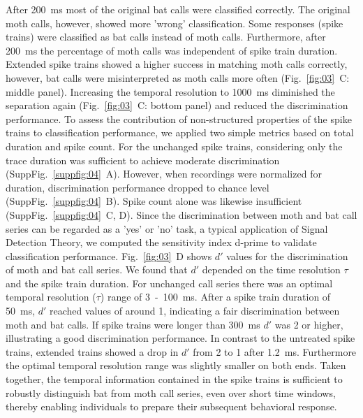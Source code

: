 \documentclass[12pt,a4paper]{article}
\newcommand{\fig}[2]{(Fig.~#1~#2)}
\newcommand{\suppfig}[2]{(SuppFig.~#1~#2)}
\begin{document}
After 200~ms most of the original bat calls were classified correctly. The original moth calls, however, showed more 'wrong' classification. Some responses (spike trains) were classified as bat calls instead of moth calls. Furthermore, after 200~ms the percentage of moth calls was independent of spike train duration. Extended spike trains showed a higher success in matching moth calls correctly, however, bat calls were misinterpreted as moth calls more often \fig{\ref{fig:03}}{C: middle panel}. Increasing the temporal resolution to 1000~ms diminished the separation again \fig{\ref{fig:03}}{C: bottom panel} and reduced the discrimination performance. To assess the contribution of non-structured properties of the spike trains to classification performance, we applied two simple metrics based on total duration and spike count. For the unchanged spike trains, considering only the trace duration was sufficient to achieve moderate discrimination \suppfig{\ref{suppfig:04}}{A}. However, when recordings were normalized for duration, discrimination performance dropped to chance level \suppfig{\ref{suppfig:04}}{B}. Spike count alone was likewise insufficient \suppfig{\ref{suppfig:04}}{C, D}. Since the discrimination between moth and bat call series can be regarded as a 'yes' or 'no' task, a typical application of Signal Detection Theory, we computed the sensitivity index d-prime to validate classification performance. Fig.~\ref{fig:03}~D shows $d'$ values for the discrimination of moth and bat call series. We found that $d'$ depended on the time resolution $\tau$ and the spike train duration. For unchanged call series there was an optimal temporal resolution ($ \tau $) range of 3~-~100~ms. After a spike train duration of 50~ms, $d'$ reached values of around 1, indicating a fair discrimination between moth and bat calls. If spike trains were longer than 300~ms $d'$ was 2 or higher, illustrating a good discrimination performance. In contrast to the untreated spike trains, extended trains showed a drop in $d'$ from 2 to 1 after 1.2~ms. Furthermore the optimal temporal resolution range was slightly smaller on both ends. Taken together, the temporal information contained in the spike trains is sufficient to robustly distinguish bat from moth call series, even over short time windows, thereby enabling individuals to prepare their subsequent behavioral response.
\end{document}
